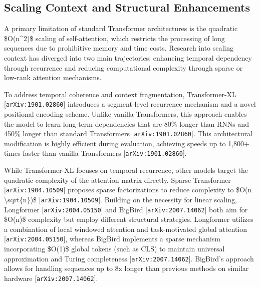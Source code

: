\documentclass[11pt]{article}
\begin{document}
\subsection{Scaling Context and Structural Enhancements}

A primary limitation of standard Transformer architectures is the quadratic \$O(n\textasciicircum{}2)\$ scaling of self-attention, which restricts the processing of long sequences due to prohibitive memory and time costs. Research into scaling context has diverged into two main trajectories: enhancing temporal dependency through recurrence and reducing computational complexity through sparse or low-rank attention mechanisms.

To address temporal coherence and context fragmentation, Transformer-XL [\texttt{arXiv:1901.02860}] introduces a segment-level recurrence mechanism and a novel positional encoding scheme. Unlike vanilla Transformers, this approach enables the model to learn long-term dependencies that are 80\% longer than RNNs and 450\% longer than standard Transformers [\texttt{arXiv:1901.02860}]. This architectural modification is highly efficient during evaluation, achieving speeds up to 1,800+ times faster than vanilla Transformers [\texttt{arXiv:1901.02860}].

While Transformer-XL focuses on temporal recurrence, other models target the quadratic complexity of the attention matrix directly. Sparse Transformer [\texttt{arXiv:1904.10509}] proposes sparse factorizations to reduce complexity to \$O(n \textbackslash{}sqrt\{n\})\$ [\texttt{arXiv:1904.10509}]. Building on the necessity for linear scaling, Longformer [\texttt{arXiv:2004.05150}] and BigBird [\texttt{arXiv:2007.14062}] both aim for \$O(n)\$ complexity but employ different structural strategies. Longformer utilizes a combination of local windowed attention and task-motivated global attention [\texttt{arXiv:2004.05150}], whereas BigBird implements a sparse mechanism incorporating \$O(1)\$ global tokens (such as CLS) to maintain universal approximation and Turing completeness [\texttt{arXiv:2007.14062}]. BigBird’s approach allows for handling sequences up to 8x longer than previous methods on similar hardware [\texttt{arXiv:2007.14062}].
\end{document}
